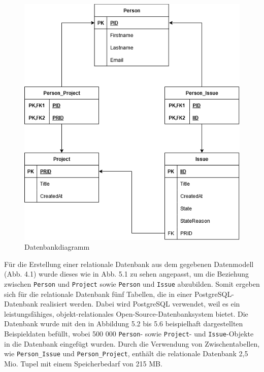\begin{figure}[H]
	\centering
	\includegraphics[scale=0.6]{Illustrations/table_diagram.png}
	\caption{Datenbankdiagramm}
\end{figure}
\newpage
\noindent
Für die Erstellung einer relationale Datenbank aus dem gegebenen Datenmodell (Abb. 4.1) wurde dieses wie in Abb. 5.1 zu sehen angepasst, um die Beziehung zwischen \texttt{Person} und \texttt{Project} sowie \texttt{Person} und \texttt{Issue} abzubilden. Somit ergeben sich für die relationale Datenbank fünf Tabellen, die in einer PostgreSQL- Datenbank realisiert werden. Dabei wird PostgreSQL verwendet, weil es ein leistungsfähiges, objekt-relationales Open-Source-Datenbanksystem bietet. Die Datenbank wurde mit den in Abbildung 5.2 bis 5.6 beispielhaft dargestellten Beispieldaten befüllt, wobei 500 000 \texttt{Person}- sowie \texttt{Project}- und \texttt{Issue}-Objekte in die Datenbank eingefügt wurden. Durch die Verwendung von Zwischentabellen, wie \texttt{Person\_Issue} und \texttt{Person\_Project}, enthält die relationale Datenbank 2,5 Mio. Tupel mit einem Speicherbedarf von 215 MB. 

